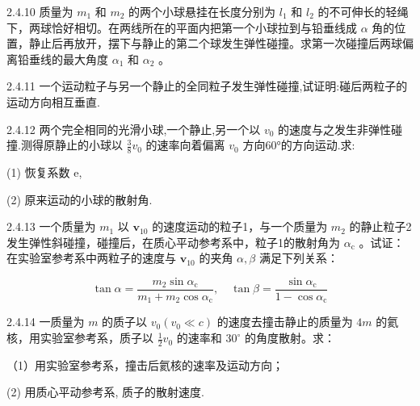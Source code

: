 \begin{problem}{2.4.10}
质量为 $m_{1}$ 和 $m_{2}$ 的两个小球悬挂在长度分别为 $l_{1}$ 和 $l_{2}$ 的不可伸长的轻绳下，两球恰好相切。在两线所在的平面内把第一个小球拉到与铅垂线成 $\alpha$ 角的位置，静止后再放开，摆下与静止的第二个球发生弹性碰撞。求第一次碰撞后两球偏离铅垂线的最大角度 $\alpha_{1}$ 和 $\alpha_{2}$ 。
\end{problem}
\clearpage


\begin{problem}{2.4.11}
一个运动粒子与另一个静止的全同粒子发生弹性碰撞,试证明:碰后两粒子的运动方向相互垂直.
\end{problem}
\clearpage


\begin{problem}{2.4.12}
两个完全相同的光滑小球,一个静止,另一个以 $v_{0}$ 的速度与之发生非弹性碰撞.测得原静止的小球以 $\frac{3}{8}v_{0}$ 的速率向着偏离 $v_{0}$ 方向60°的方向运动.求:

(1) 恢复系数 e,

(2) 原来运动的小球的散射角.
\begin{center}

\end{center}
\end{problem}
\clearpage


\begin{problem}{2.4.13}
一个质量为 $m_{1}$ 以 $\bm{v}_{10}$ 的速度运动的粒子1，与一个质量为 $m_{2}$ 的静止粒子2发生弹性斜碰撞，碰撞后，在质心平动参考系中，粒子1的散射角为 $\alpha_{\mathrm{c}}$ 。试证：在实验室参考系中两粒子的速度与 $\bm{v}_{10}$ 的夹角 $\alpha, \beta$ 满足下列关系：

\[
\tan \alpha = \frac {m _ {2} \sin \alpha_ {\mathrm{c}}}{m _ {1} + m _ {2} \cos \alpha_ {\mathrm{c}}}, \quad \tan \beta = \frac {\sin \alpha_ {\mathrm{c}}}{1 - \cos \alpha_ {\mathrm{c}}}
\]
\end{problem}
\clearpage


\begin{problem}{2.4.14}
一质量为 $m$ 的质子以 $v_{0}(v_{0} \ll c)$ 的速度去撞击静止的质量为 $4m$ 的氦核，用实验室参考系，质子以 $\frac{1}{2} v_{0}$ 的速率和 $30^{\circ}$ 的角度散射。求：

（1）用实验室参考系，撞击后氦核的速率及运动方向；

(2) 用质心平动参考系, 质子的散射速度.
\begin{center}

\end{center}
\end{problem}
\clearpage

